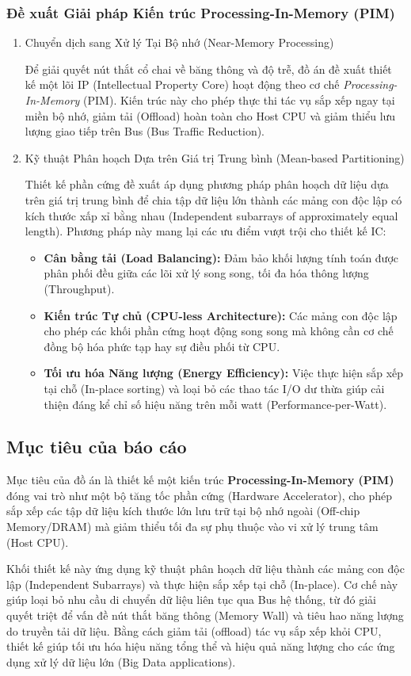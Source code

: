 \subsubsection{Đề xuất Giải pháp Kiến trúc Processing-In-Memory (PIM)}

\begin{enumerate}[label=\alph*.]
	\item Chuyển dịch sang Xử lý Tại Bộ nhớ (Near-Memory Processing)
	
	Để giải quyết nút thắt cổ chai về băng thông và độ trễ, đồ án đề xuất thiết kế một lõi IP (Intellectual Property Core) hoạt động theo cơ chế \textit{Processing-In-Memory} (PIM). Kiến trúc này cho phép thực thi tác vụ sắp xếp ngay tại miền bộ nhớ, giảm tải (Offload) hoàn toàn cho Host CPU và giảm thiểu lưu lượng giao tiếp trên Bus (Bus Traffic Reduction).
	
	\item Kỹ thuật Phân hoạch Dựa trên Giá trị Trung bình (Mean-based Partitioning)
	
	Thiết kế phần cứng đề xuất áp dụng phương pháp phân hoạch dữ liệu dựa trên giá trị trung bình để chia tập dữ liệu lớn thành các mảng con độc lập có kích thước xấp xỉ bằng nhau (Independent subarrays of approximately equal length). Phương pháp này mang lại các ưu điểm vượt trội cho thiết kế IC:
	\begin{itemize}
		\item \textbf{Cân bằng tải (Load Balancing):} Đảm bảo khối lượng tính toán được phân phối đều giữa các lõi xử lý song song, tối đa hóa thông lượng (Throughput).
		\item \textbf{Kiến trúc Tự chủ (CPU-less Architecture):} Các mảng con độc lập cho phép các khối phần cứng hoạt động song song mà không cần cơ chế đồng bộ hóa phức tạp hay sự điều phối từ CPU.
		\item \textbf{Tối ưu hóa Năng lượng (Energy Efficiency):} Việc thực hiện sắp xếp tại chỗ (In-place sorting) và loại bỏ các thao tác I/O dư thừa giúp cải thiện đáng kể chỉ số hiệu năng trên mỗi watt (Performance-per-Watt).
	\end{itemize}
\end{enumerate}

\subsection{Mục tiêu của báo cáo}

Mục tiêu của đồ án là thiết kế một kiến trúc \textbf{Processing-In-Memory (PIM)} đóng vai trò như một bộ tăng tốc phần cứng (Hardware Accelerator), cho phép sắp xếp các tập dữ liệu kích thước lớn lưu trữ tại bộ nhớ ngoài (Off-chip Memory/DRAM) mà giảm thiểu tối đa sự phụ thuộc vào vi xử lý trung tâm (Host CPU).

Khối thiết kế này ứng dụng kỹ thuật phân hoạch dữ liệu thành các mảng con độc lập (Independent Subarrays) và thực hiện sắp xếp tại chỗ (In-place). Cơ chế này giúp loại bỏ nhu cầu di chuyển dữ liệu liên tục qua Bus hệ thống, từ đó giải quyết triệt để vấn đề nút thắt băng thông (Memory Wall) và tiêu hao năng lượng do truyền tải dữ liệu. Bằng cách giảm tải (offload) tác vụ sắp xếp khỏi CPU, thiết kế giúp tối ưu hóa hiệu năng tổng thể và hiệu quả năng lượng cho các ứng dụng xử lý dữ liệu lớn (Big Data applications).